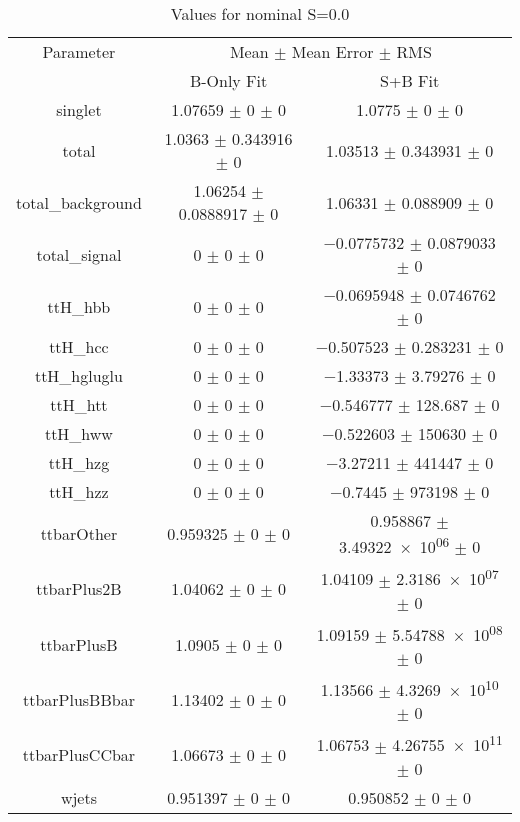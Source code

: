 \begin{table}
\centering
\caption{Values for nominal S=0.0}
\begin{tabular}{ccc}
\toprule
Parameter & \multicolumn{2}{c}{Mean $\pm$ Mean Error $\pm$ RMS}\\
 & B-Only Fit & S+B Fit\\
\midrule
singlet & \num{1.07659} $\pm$ \num{0} $\pm$ \num{0} & \num{1.0775} $\pm$ \num{0} $\pm$ \num{0}\\
total & \num{1.0363} $\pm$ \num{0.343916} $\pm$ \num{0} & \num{1.03513} $\pm$ \num{0.343931} $\pm$ \num{0}\\
total\_background & \num{1.06254} $\pm$ \num{0.0888917} $\pm$ \num{0} & \num{1.06331} $\pm$ \num{0.088909} $\pm$ \num{0}\\
total\_signal & \num{0} $\pm$ \num{0} $\pm$ \num{0} & \num{-0.0775732} $\pm$ \num{0.0879033} $\pm$ \num{0}\\
ttH\_hbb & \num{0} $\pm$ \num{0} $\pm$ \num{0} & \num{-0.0695948} $\pm$ \num{0.0746762} $\pm$ \num{0}\\
ttH\_hcc & \num{0} $\pm$ \num{0} $\pm$ \num{0} & \num{-0.507523} $\pm$ \num{0.283231} $\pm$ \num{0}\\
ttH\_hgluglu & \num{0} $\pm$ \num{0} $\pm$ \num{0} & \num{-1.33373} $\pm$ \num{3.79276} $\pm$ \num{0}\\
ttH\_htt & \num{0} $\pm$ \num{0} $\pm$ \num{0} & \num{-0.546777} $\pm$ \num{128.687} $\pm$ \num{0}\\
ttH\_hww & \num{0} $\pm$ \num{0} $\pm$ \num{0} & \num{-0.522603} $\pm$ \num{150630} $\pm$ \num{0}\\
ttH\_hzg & \num{0} $\pm$ \num{0} $\pm$ \num{0} & \num{-3.27211} $\pm$ \num{441447} $\pm$ \num{0}\\
ttH\_hzz & \num{0} $\pm$ \num{0} $\pm$ \num{0} & \num{-0.7445} $\pm$ \num{973198} $\pm$ \num{0}\\
ttbarOther & \num{0.959325} $\pm$ \num{0} $\pm$ \num{0} & \num{0.958867} $\pm$ \num{3.49322e+06} $\pm$ \num{0}\\
ttbarPlus2B & \num{1.04062} $\pm$ \num{0} $\pm$ \num{0} & \num{1.04109} $\pm$ \num{2.3186e+07} $\pm$ \num{0}\\
ttbarPlusB & \num{1.0905} $\pm$ \num{0} $\pm$ \num{0} & \num{1.09159} $\pm$ \num{5.54788e+08} $\pm$ \num{0}\\
ttbarPlusBBbar & \num{1.13402} $\pm$ \num{0} $\pm$ \num{0} & \num{1.13566} $\pm$ \num{4.3269e+10} $\pm$ \num{0}\\
ttbarPlusCCbar & \num{1.06673} $\pm$ \num{0} $\pm$ \num{0} & \num{1.06753} $\pm$ \num{4.26755e+11} $\pm$ \num{0}\\
wjets & \num{0.951397} $\pm$ \num{0} $\pm$ \num{0} & \num{0.950852} $\pm$ \num{0} $\pm$ \num{0}\\
\bottomrule
\end{tabular}
\end{table}